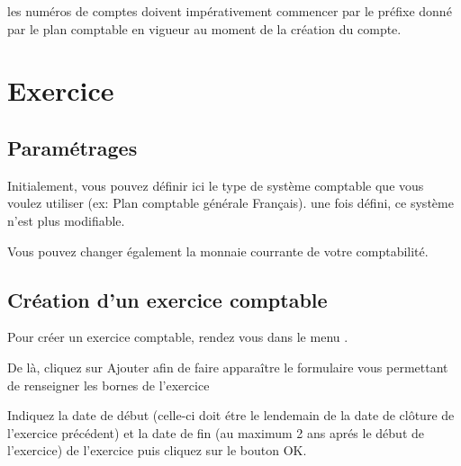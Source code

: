 \documentclass[a4paper,10pt,oneside,french]{sphinxmanual}
\begin{document}
les numéros de comptes doivent impérativement commencer par le préfixe donné par le
plan comptable en vigueur au moment de la création du compte.


\section{Exercice}
\label{\detokenize{accounting/fiscalyear:exercice}}\label{\detokenize{accounting/fiscalyear::doc}}

\subsection{Paramétrages}
\label{\detokenize{accounting/fiscalyear:parametrages}}\begin{quote}

\noindent{}
\end{quote}

Initialement, vous pouvez définir ici le type de système comptable que
vous voulez utiliser (ex: Plan comptable générale Français).
 une fois défini, ce système n’est plus modifiable.

Vous pouvez changer également la monnaie courrante de votre comptabilité.


\subsection{Création d’un exercice comptable}
\label{\detokenize{accounting/fiscalyear:creation-d-un-exercice-comptable}}
Pour créer un exercice comptable, rendez vous dans le menu .
\begin{quote}

\noindent{}
\end{quote}

De là, cliquez sur Ajouter afin de faire apparaître le formulaire vous permettant de renseigner les bornes de l’exercice
\begin{quote}

\noindent{}
\end{quote}

Indiquez la date de début (celle-ci doit étre le lendemain de la date
de clôture de l’exercice précédent) et la date de fin (au maximum 2 ans
aprés le début de l’exercice) de l’exercice puis cliquez sur le bouton
OK.
\end{document}

